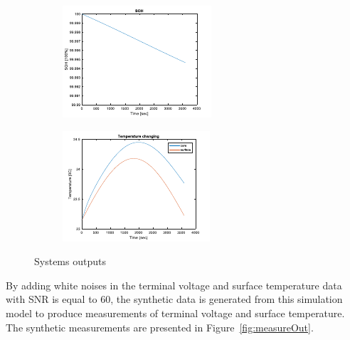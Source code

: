 \documentclass[12pt]{article}
\begin{document}
\begin{figure}[H]
\begin{subfigure}[t]{0.45\linewidth}
	\end{subfigure}	
	\begin{subfigure}[t]{0.45\linewidth}
		\includegraphics[width=\linewidth]{figures/sysOutput3.pdf}
	\end{subfigure}
	\begin{subfigure}[t]{0.45\linewidth}
		\includegraphics[width=\linewidth]{figures/sysOutput4.pdf}
	\end{subfigure}	
	\caption{Systems outputs}\label{fig:sysOutput}
\end{figure}
By adding white noises in the terminal voltage and surface temperature data with SNR is equal to 60, the synthetic data is generated from this simulation model to produce measurements of terminal voltage and surface temperature. The synthetic measurements are presented in Figure~\ref{fig:measureOut}.
\end{document}
